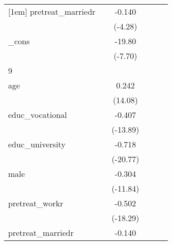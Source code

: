 {\begin{tabular}{l*{5}{c}}
[1em]
pretreat\_marriedr&                     &      -0.140\sym{***}&                     &                     &                     \\
            &                     &     (-4.28)         &                     &                     &                     \\
[1em]
\_cons      &                     &      -19.80\sym{***}&                     &                     &                     \\
            &                     &     (-7.70)         &                     &                     &                     \\
\hline
9           &                     &                     &                     &                     &                     \\
age         &                     &       0.242\sym{***}&                     &                     &                     \\
            &                     &     (14.08)         &                     &                     &                     \\
[1em]
educ\_vocational&                     &      -0.407\sym{***}&                     &                     &                     \\
            &                     &    (-13.89)         &                     &                     &                     \\
[1em]
educ\_university&                     &      -0.718\sym{***}&                     &                     &                     \\
            &                     &    (-20.77)         &                     &                     &                     \\
[1em]
male        &                     &      -0.304\sym{***}&                     &                     &                     \\
            &                     &    (-11.84)         &                     &                     &                     \\
[1em]
pretreat\_workr&                     &      -0.502\sym{***}&                     &                     &                     \\
            &                     &    (-18.29)         &                     &                     &                     \\
[1em]
pretreat\_marriedr&                     &      -0.140\sym{***}&                     &                     &                     \\

\end{tabular}}
